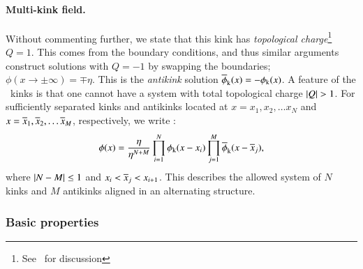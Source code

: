 

    \paragraph{Multi-kink field.} %
    Without commenting further, we state that this kink has \emph{topological charge}\footnote{See~\citet[see][~1]{vachaspatiKinksDomainWalls2006} for discussion} $Q=1$. %
    This comes from the boundary conditions, and thus similar arguments construct solutions with $Q=-1$ by swapping the boundaries; $\phi(x\to \pm \infty) = \mp \eta$. This is the \emph{antikink} solution $\overline{\phi}_\mathrm{k}(x)=- \phi_\mathrm{k}(x)$. A feature of the \Zn~kinks is that one cannot have a system with total topological charge $\abs{Q}>1$. For sufficiently separated kinks and antikinks located at $x = x_{1}, x_2, \dots x_N$ and $x = \overline{x}_1, \overline{x}_2, \dots \overline{x}_M $, respectively, we write \citep{vachaspatiKinksDomainWalls2006}:
    \begin{equation}\label{eq:cosmo:defects:many_kinks}
        \phi(x) = \frac{\eta}{\eta^{N+M}} \prod_{i=1}^{N} \phi_\mathrm{k}(x-x_i) \prod_{j=1}^{M} \overline{\phi}_\mathrm{k}(x-\overline{x}_j),
    \end{equation}
    where $\abs{N-M}\leq 1$ and $x_i < \overline{x}_j < x_{i+1}$. This describes the allowed system of $N$ kinks and $M$ antikinks aligned in an alternating structure.


    \subsubsection{Basic properties}

